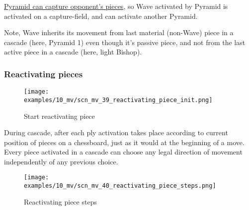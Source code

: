 \vspace*{-0.3\baselineskip}
\hyperref[fig:scn_ma_02_pyramid_activated]{Pyramid can capture opponent's pieces},
so Wave activated by Pyramid is activated on a capture-field, and can activate
another Pyramid.

Note, Wave inherits its movement from last material (non-Wave) piece in a cascade
(here, Pyramid 1) even though it's passive piece, and not from the last active
piece in a cascade (here, light Bishop).

\clearpage %

\subsubsection*{Reactivating pieces}
\label{sec:Miranda's veil/Wave/Cascading Waves/Reactivating pieces}

\vspace*{-1.4\baselineskip}
\noindent
\begin{figure}[!h]
\texttt{[image: examples/10\_mv/scn\_mv\_39\_reactivating\_piece\_init.png]}
\caption{Start reactivating piece}
\label{fig:scn_mv_39_reactivating_piece_init}
\end{figure}

During cascade, after each ply activation takes place according to current position
of pieces on a chessboard, just as it would at the beginning of a move. Every piece
activated in a cascade can choose any legal direction of movement independently of
any previous choice.

\clearpage %

\vspace*{-2.1\baselineskip}
\noindent
\begin{figure}[!h]
\texttt{[image: examples/10\_mv/scn\_mv\_40\_reactivating\_piece\_steps.png]}
\vspace*{-1.3\baselineskip}
\caption{Reactivating piece steps}
\label{fig:scn_mv_40_reactivating_piece_steps}
\end{figure}


